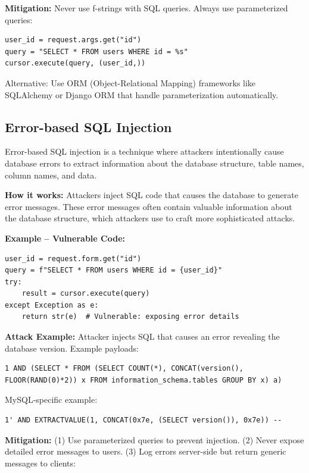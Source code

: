 \textbf{Mitigation:} Never use f-strings with SQL queries. Always use parameterized queries:

\begin{lstlisting}[style=pycode]
user_id = request.args.get("id")
query = "SELECT * FROM users WHERE id = %s"
cursor.execute(query, (user_id,))
\end{lstlisting}
Alternative: Use ORM (Object-Relational Mapping) frameworks like SQLAlchemy or Django ORM that handle parameterization automatically.

\subsection{Error-based SQL Injection}
\label{sec:sqli_error_based}

Error-based SQL injection is a technique where attackers intentionally cause database errors to extract information about the database structure, table names, column names, and data.

\textbf{How it works:} Attackers inject SQL code that causes the database to generate error messages. These error messages often contain valuable information about the database structure, which attackers use to craft more sophisticated attacks.

\textbf{Example -- Vulnerable Code:}

\begin{lstlisting}[style=pycode]
user_id = request.form.get("id")
query = f"SELECT * FROM users WHERE id = {user_id}"
try:
    result = cursor.execute(query)
except Exception as e:
    return str(e)  # Vulnerable: exposing error details
\end{lstlisting}

\textbf{Attack Example:} Attacker injects SQL that causes an error revealing the database version. Example payloads:
\begin{lstlisting}[style=attackcode]
1 AND (SELECT * FROM (SELECT COUNT(*), CONCAT(version(), FLOOR(RAND(0)*2)) x FROM information_schema.tables GROUP BY x) a)
\end{lstlisting}
MySQL-specific example:
\begin{lstlisting}[style=attackcode]
1' AND EXTRACTVALUE(1, CONCAT(0x7e, (SELECT version()), 0x7e)) --
\end{lstlisting}

\textbf{Mitigation:} (1) Use parameterized queries to prevent injection. (2) Never expose detailed error messages to users. (3) Log errors server-side but return generic messages to clients:

